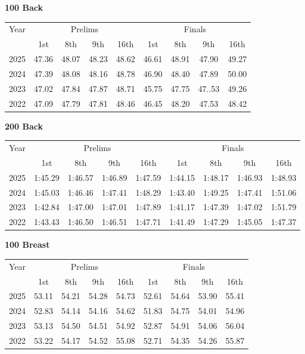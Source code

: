 \textbf{100 Back}

\begin{flushleft}
\begin{tabular}{|c|c|c|c|c|c|c|c|c|}
\hline
Year & \multicolumn{4}{c|}{Prelims} & \multicolumn{4}{c|}{Finals} \\
\cline{2-9}
& 1st & 8th & 9th & 16th & 1st & 8th & 9th & 16th \\
\hline
2025 & 47.36 & 48.07 & 48.23 & 48.62 & 46.61 & 48.91 & 47.90 & 49.27 \\
2024 & 47.39 & 48.08 & 48.16 & 48.78 & 46.90 & 48.40 & 47.89 & 50.00 \\
2023 & 47.02 & 47.84 & 47.87 & 48.71 & 45.75 & 47.75 & 47..53 & 49.26 \\
2022 & 47.09 & 47.79 & 47.81 & 48.46 & 46.45 & 48.20 & 47.53 & 48.42 \\
\hline
\end{tabular}
\end{flushleft}

\textbf{200 Back}

\begin{flushleft}
\begin{tabular}{|c|c|c|c|c|c|c|c|c|}
\hline
Year & \multicolumn{4}{c|}{Prelims} & \multicolumn{4}{c|}{Finals} \\
\cline{2-9}
& 1st & 8th & 9th & 16th & 1st & 8th & 9th & 16th \\
\hline
2025 & 1:45.29 & 1:46.57 & 1:46.89 & 1:47.59 & 1:44.15 & 1:48.17 & 1:46.93 & 1:48.93 \\
2024 & 1:45.03 & 1:46.46 & 1:47.41 & 1:48.29 & 1:43.40 & 1:49.25 & 1:47.41 & 1:51.06 \\
2023 & 1:42.84 & 1:47.00 & 1:47.01 & 1:47.89 & 1:41.17 & 1:47.39 & 1:47.02 & 1:51.79 \\
2022 & 1:43.43 & 1:46.50 & 1:46.51 & 1:47.71 & 1:41.49 & 1:47.29 & 1:45.05 & 1:47.37 \\
\hline
\end{tabular}
\end{flushleft}

\textbf{100 Breast}

\begin{flushleft}
\begin{tabular}{|c|c|c|c|c|c|c|c|c|}
\hline
Year & \multicolumn{4}{c|}{Prelims} & \multicolumn{4}{c|}{Finals} \\
\cline{2-9}
& 1st & 8th & 9th & 16th & 1st & 8th & 9th & 16th \\
\hline
2025 & 53.11 & 54.21 & 54.28 & 54.73 & 52.61 & 54.64 & 53.90 & 55.41 \\
2024 & 52.83 & 54.14 & 54.16 & 54.62 & 51.83 & 54.75 & 54.01 & 54.96 \\
2023 & 53.13 & 54.50 & 54.51 & 54.92 & 52.87 & 54.91 & 54.06 & 56.04 \\
2022 & 53.22 & 54.17 & 54.52 & 55.08 & 52.71 & 54.35 & 54.26 & 55.87 \\
\hline
\end{tabular}
\end{flushleft}

